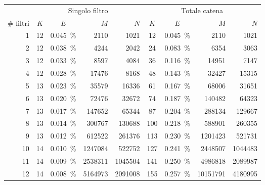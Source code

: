 \begin{tabular}{ r | c c r r | c c r r }
    \hline
    \rowcolor{blue!20}           & \multicolumn{4}{c}{Singolo filtro} & \multicolumn{4}{c}{Totale catena} \\
    \rowcolor{blue!20} \# filtri & $K$ & $E$ & $M$ & $N$              & $K$ & $E$ & $M$ & $N$ \\
    \hline
    \rowcolor[gray]{0.925}
    \num{1} & \num{12} & \SI{0.045}{\%} & \num{2110} & \num{1021} & \num{12} & \SI{0.045}{\%} & \num{2110} & \num{1021} \\
    \num{2} & \num{12} & \SI{0.038}{\%} & \num{4244} & \num{2042} & \num{24} & \SI{0.083}{\%} & \num{6354} & \num{3063} \\
    \rowcolor[gray]{0.925}
    \num{3} & \num{12} & \SI{0.033}{\%} & \num{8597} & \num{4084} & \num{36} & \SI{0.116}{\%} & \num{14951} & \num{7147} \\
    \num{4} & \num{12} & \SI{0.028}{\%} & \num{17476} & \num{8168} & \num{48} & \SI{0.143}{\%} & \num{32427} & \num{15315} \\
    \rowcolor[gray]{0.925}
    \num{5} & \num{13} & \SI{0.023}{\%} & \num{35579} & \num{16336} & \num{61} & \SI{0.167}{\%} & \num{68006} & \num{31651} \\
    \num{6} & \num{13} & \SI{0.020}{\%} & \num{72476} & \num{32672} & \num{74} & \SI{0.187}{\%} & \num{140482} & \num{64323} \\
    \rowcolor[gray]{0.925}
    \num{7} & \num{13} & \SI{0.017}{\%} & \num{147652} & \num{65344} & \num{87} & \SI{0.204}{\%} & \num{288134} & \num{129667} \\
    \num{8} & \num{13} & \SI{0.014}{\%} & \num{300767} & \num{130688} & \num{100} & \SI{0.218}{\%} & \num{588901} & \num{260355} \\
    \rowcolor[gray]{0.925}
    \num{9} & \num{13} & \SI{0.012}{\%} & \num{612522} & \num{261376} & \num{113} & \SI{0.230}{\%} & \num{1201423} & \num{521731} \\
    \num{10} & \num{14} & \SI{0.010}{\%} & \num{1247084} & \num{522752} & \num{127} & \SI{0.241}{\%} & \num{2448507} & \num{1044483} \\
    \rowcolor[gray]{0.925}
    \num{11} & \num{14} & \SI{0.009}{\%} & \num{2538311} & \num{1045504} & \num{141} & \SI{0.250}{\%} & \num{4986818} & \num{2089987} \\
    \num{12} & \num{14} & \SI{0.008}{\%} & \num{5164973} & \num{2091008} & \num{155} & \SI{0.257}{\%} & \num{10151791} & \num{4180995} \\

\end{tabular}
